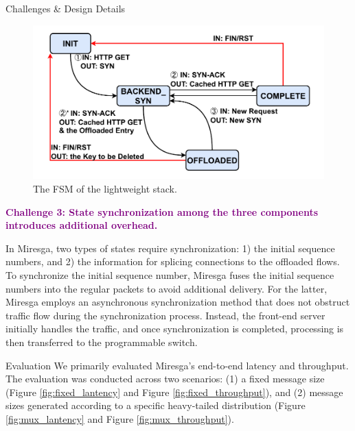 \documentclass[final, 24pt]{beamer}
\newlength{\colwidth}
\begin{document}
\begin{frame}[t]
\begin{columns}[t]
\begin{column}{\colwidth}
\begin{alertblock}{Challenges \& Design Details}
  \begin{figure}
      \centering
\includegraphics[width=0.8\colwidth]{pic/Miresga_FSM.pdf}
      \caption{The FSM of the lightweight stack.}
      \label{fig:FSM}
  \end{figure}
  
  \textbf{\textcolor{purple}{Challenge 3: State synchronization among the three components introduces additional overhead.}}
  
  In Miresga, two types of states require synchronization: 1) the initial sequence numbers, and 2) the information for splicing connections to the offloaded flows.
  To synchronize the initial sequence number, Miresga fuses the initial sequence numbers into the regular packets to avoid additional delivery. For the latter, Miresga employs an asynchronous synchronization method that does not obstruct traffic flow during the synchronization process. Instead, the front-end server initially handles the traffic, and once synchronization is completed, processing is then transferred to the programmable switch.
  
  
  
  \end{alertblock}

  \begin{block}{Evaluation}
  We primarily evaluated Miresga's end-to-end latency and throughput. The evaluation was conducted across two scenarios: (1) a fixed message size (Figure \ref{fig:fixed_lantency} and Figure \ref{fig:fixed_throughput}), and (2) message sizes generated according to a specific heavy-tailed distribution (Figure \ref{fig:mux_lantency} and Figure \ref{fig:mux_throughput}).
    \begin{figure}
        

\end{figure}
\end{block}
\end{column}
\end{columns}
\end{frame}
\end{document}
